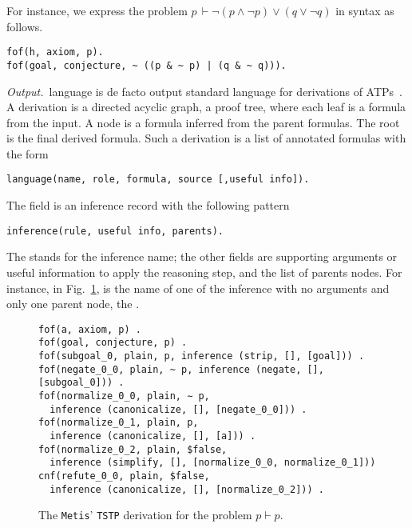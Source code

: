\documentclass[../main.tex]{subfiles}
\begin{document}
For instance, we express the problem
$p\, \vdash \neg (p \wedge \neg p) \vee (q \vee \neg q)$
in \TPTP syntax as follows.

\begin{verbatim}
fof(h, axiom, p).
fof(goal, conjecture, ~ ((p & ~ p) | (q & ~ q))).
\end{verbatim}

\textit{Output.}~\TSTP language is de facto output standard language
for derivations of ATPs~\cite{sutcliffe2004tstp}.
A \TSTP derivation is a directed acyclic graph, a proof tree, where each leaf
is a formula from the \TPTP input. A node is a formula inferred from the parent
formulas. The root is the final derived formula. Such a derivation is a list of
annotated formulas with the form

\begin{verbatim}
language(name, role, formula, source [,useful info]).
\end{verbatim}

The  field is an inference record with the following pattern
\begin{verbatim}
inference(rule, useful info, parents).
\end{verbatim}

The  stands for the inference name; the other fields are
supporting arguments or useful information to apply the reasoning step, and
the list of parents nodes.
For instance, in Fig.~\ref{fig:metis-proof-tstp}, \strip is the name of one
of the inference with no arguments and only one parent node, the .

\begin{figure}
\begin{verbatim}
fof(a, axiom, p) .
fof(goal, conjecture, p) .
fof(subgoal_0, plain, p, inference (strip, [], [goal])) .
fof(negate_0_0, plain, ~ p, inference (negate, [], [subgoal_0])) .
fof(normalize_0_0, plain, ∼ p,
  inference (canonicalize, [], [negate_0_0])) .
fof(normalize_0_1, plain, p,
  inference (canonicalize, [], [a])) .
fof(normalize_0_2, plain, $false,
  inference (simplify, [], [normalize_0_0, normalize_0_1]))
cnf(refute_0_0, plain, $false,
  inference (canonicalize, [], [normalize_0_2])) .
\end{verbatim}
\caption{The \texttt{Metis}' \texttt{TSTP} derivation for the problem $p\vdash p$.}
\label{fig:metis-proof-tstp}
\end{figure}

\end{document}

